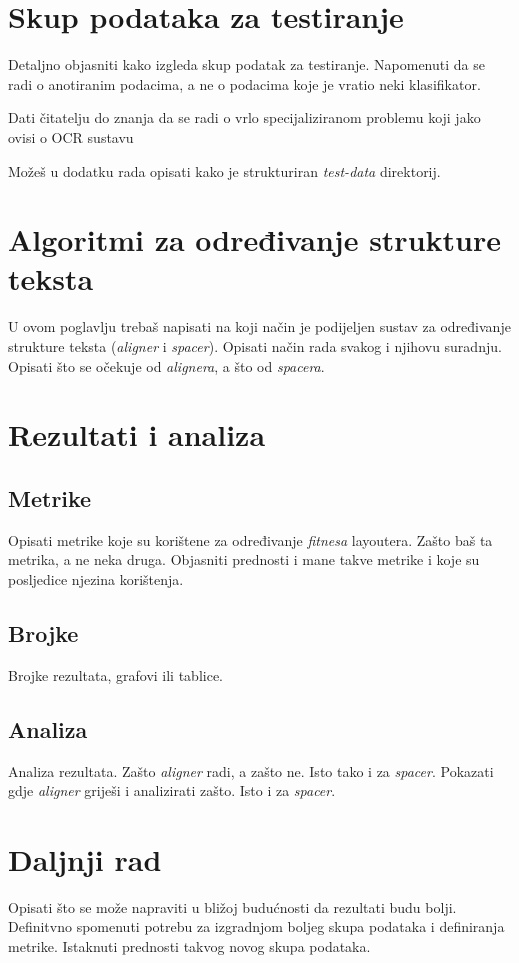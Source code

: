 \documentclass[times, utf8, zavrsni]{fer}
\begin{document}
\chapter{Skup podataka za testiranje}
\label{chap:skup-padataka-za-testiranje}

Detaljno objasniti kako izgleda skup podatak za testiranje. Napomenuti da se
radi o anotiranim podacima, a ne o podacima koje je vratio neki klasifikator.

Dati čitatelju do znanja da se radi o vrlo specijaliziranom problemu koji
jako ovisi o OCR sustavu

Možeš u dodatku rada opisati kako je strukturiran \emph{test-data} direktorij.

\chapter{Algoritmi za određivanje strukture teksta}
U ovom poglavlju trebaš napisati na koji način je podijeljen sustav za određivanje
strukture teksta (\emph{aligner} i \emph{spacer}). Opisati način rada svakog
i njihovu suradnju. Opisati što se očekuje od \emph{alignera}, a što od \emph{spacera}.

\chapter{Rezultati i analiza}
\section{Metrike}
Opisati metrike koje su korištene za određivanje \emph{fitnesa} layoutera.
Zašto baš ta metrika, a ne neka druga. Objasniti prednosti i mane takve metrike
i koje su posljedice njezina korištenja.

\section{Brojke}
Brojke rezultata, grafovi ili tablice.

\section{Analiza}
Analiza rezultata. Zašto \emph{aligner} radi, a zašto ne. Isto tako i za
\emph{spacer}. Pokazati gdje \emph{aligner} griješi i analizirati zašto. Isto i za
\emph{spacer}.

\chapter{Daljnji rad}
Opisati što se može napraviti u bližoj budućnosti da rezultati budu bolji.
Definitvno spomenuti potrebu za izgradnjom boljeg skupa podataka i definiranja
metrike. Istaknuti prednosti takvog novog skupa podataka.
\end{document}
